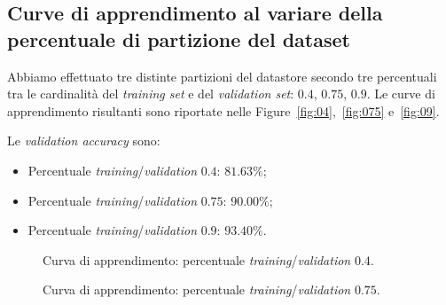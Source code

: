 \documentclass[a4paper,12pt]{article}
\begin{document}
\newpage
\subsection{Curve di apprendimento al variare della percentuale di partizione del dataset}
Abbiamo effettuato tre distinte partizioni del datastore secondo tre percentuali tra le cardinalità del \emph{training set} e del \emph{validation set}: $0.4$, $0.75$, $0.9$. Le curve di apprendimento risultanti sono riportate nelle Figure~\vref{fig:04},~\vref{fig:075} e~\vref{fig:09}.\medskip

Le \emph{validation accuracy} sono:
\begin{itemize}
    \item Percentuale \emph{training}/\emph{validation} $0.4$: $81.63\%$;
    \item Percentuale \emph{training}/\emph{validation} $0.75$: $90.00\%$;
    \item Percentuale \emph{training}/\emph{validation} $0.9$: $93.40\%$.
\end{itemize}

\begin{figure}[htb]
    \hspace*{-2.1cm}
    \caption{Curva di apprendimento: percentuale \emph{training}/\emph{validation} $0.4$.}
    \label{fig:04}
\end{figure}

\begin{figure}[htb]
    \vspace*{-1.2cm}\hspace*{-2.1cm}
    \caption{Curva di apprendimento: percentuale \emph{training}/\emph{validation} $0.75$.}
    \label{fig:075}
\end{figure}
\end{document}
